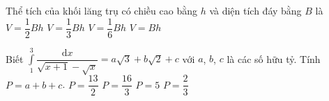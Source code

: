 \begin{ex}%
Thể tích của khối lăng trụ có chiều cao bằng $h$ và diện tích đáy bằng $B$ là
\choice
{$V=\dfrac{1}{2}Bh$}
{$V=\dfrac{1}{3}Bh$}
{$V=\dfrac{1}{6}Bh$}
{\True $V=Bh$}
\end{ex}

\begin{ex}%
Biết $\displaystyle\int\limits_1^3\dfrac{\mathrm{d}x}{\sqrt{x+1}-\sqrt{x}}=a\sqrt{3}+b\sqrt{2}+c$ với $a$, $b$, $c$ là các số hữu tỷ. Tính $P =a+b+c$.
\choice
{$P=\dfrac{13}{2}$}
{\True $P=\dfrac{16}{3}$}
{$P=5$}
{$P=\dfrac{2}{3}$}
\end{ex}

